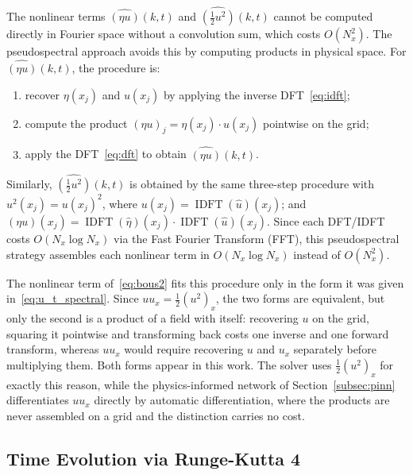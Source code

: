 The nonlinear terms $\widehat{(\eta u)}(k,t)$ and $\widehat{(\frac{1}{2}u^2)}(k,t)$ cannot be computed directly in Fourier space without a convolution sum, which costs $O(N_x^2)$. The pseudospectral approach avoids this by computing products in physical space. For $\widehat{(\eta u)}(k,t)$, the procedure is:
\begin{enumerate}
    \item recover $\eta(x_j)$ and $u(x_j)$ by applying the inverse DFT~\eqref{eq:idft};
    \item compute the product $(\eta u)_j = \eta(x_j)\cdot u(x_j)$ pointwise on the grid;
    \item apply the DFT~\eqref{eq:dft} to obtain $\widehat{(\eta u)}(k,t)$.
\end{enumerate}
Similarly, $\widehat{(\frac{1}{2}u^2)}(k,t)$ is obtained by the same three-step procedure with $u^2(x_j) = u(x_j)^2$, where $u(x_j) = \operatorname{IDFT}(\hat{u})(x_j)$; and $(\eta u)(x_j) = \operatorname{IDFT}(\hat{\eta})(x_j)\cdot\operatorname{IDFT}(\hat{u})(x_j)$. Since each DFT/IDFT costs $O(N_x \log N_x)$ via the Fast Fourier Transform (FFT), this pseudospectral strategy assembles each nonlinear term in $O(N_x \log N_x)$ instead of $O(N_x^2)$.

The nonlinear term of~\eqref{eq:bous2} fits this procedure only in the form it was given in~\eqref{eq:u_t_spectral}. Since $u u_x = \frac{1}{2}(u^2)_x$, the two forms are equivalent, but only the second is a product of a field with itself: recovering $u$ on the grid, squaring it pointwise and transforming back costs one inverse and one forward transform, whereas $u u_x$ would require recovering $u$ and $u_x$ separately before multiplying them. Both forms appear in this work. The solver uses $\frac{1}{2}(u^2)_x$ for exactly this reason, while the physics-informed network of Section~\ref{subsec:pinn} differentiates $u u_x$ directly by automatic differentiation, where the products are never assembled on a grid and the distinction carries no cost.

\subsection{Time Evolution via Runge-Kutta 4}
\label{subsec:rk4}

